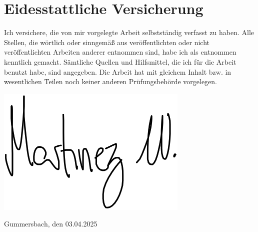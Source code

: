 \clearpage
\thispagestyle{empty}
\section*{Eidesstattliche Versicherung}
\label{sec:SOOA}

\vspace{2.5cm}

Ich versichere, die von mir vorgelegte Arbeit selbstständig verfasst zu haben. Alle Stellen, die wörtlich oder sinngemäß aus veröffentlichten oder nicht veröffentlichten Arbeiten anderer entnommen sind, habe ich als entnommen kenntlich gemacht. Sämtliche Quellen und Hilfsmittel, die ich für die Arbeit benutzt habe, sind angegeben. Die Arbeit hat mit gleichem Inhalt bzw. in wesentlichen Teilen noch keiner anderen Prüfungsbehörde vorgelegen.

\vspace{1cm}
\noindent
\includegraphics[height=3.5\baselineskip]{Figures/signature}
\par
\noindent
\textbf{\thesisauthor{}}

\vspace{0.5cm}
\noindent
Gummersbach, den 03.04.2025
